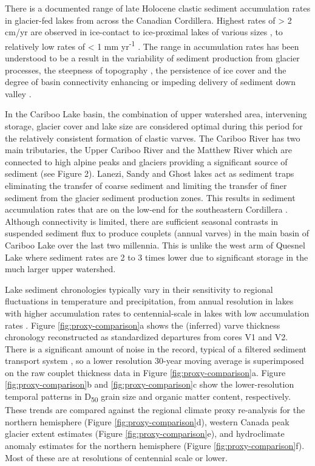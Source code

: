 \documentclass[Royal,times,doublespace,sageh]{sagej}
\begin{document}
There is a documented range of late Holocene clastic sediment
accumulation rates in glacier-fed lakes from across the Canadian
Cordillera. Highest rates of \textgreater{} 2 cm/yr are observed in
ice-contact to ice-proximal lakes of various sizes
\citep{Desloges1994, Crookshanks2008}, to relatively low rates of
\textless{} 1 mm yr\textsuperscript{-1} \citep{Gilbert2012}. The range
in accumulation rates has been understood to be a result in the
variability of sediment production from glacier processes, the steepness
of topography \citep{Ballantyne2002}, the persistence of ice cover and
the degree of basin connectivity enhancing or impeding delivery of
sediment down valley \citep{Wohl2019}.

In the Cariboo Lake basin, the combination of upper watershed area,
intervening storage, glacier cover and lake size are considered optimal
during this period for the relatively consistent formation of clastic
varves. The Cariboo River has two main tributaries, the Upper Cariboo
River and the Matthew River which are connected to high alpine peaks and
glaciers providing a significant source of sediment (see Figure 2).
Lanezi, Sandy and Ghost lakes act as sediment traps eliminating the
transfer of coarse sediment and limiting the transfer of finer sediment
from the glacier sediment production zones. This results in sediment
accumulation rates that are on the low-end for the southeastern
Cordillera \citep{Hodder2006b}. Although connectivity is limited, there
are sufficient seasonal contrasts in suspended sediment flux to produce
couplets (annual varves) in the main basin of Cariboo Lake over the last
two millennia. This is unlike the west arm of Quesnel Lake where
sediment rates are 2 to 3 times lower due to significant storage in the
much larger upper watershed.

Lake sediment chronologies typically vary in their sensitivity to
regional fluctuations in temperature and precipitation, from annual
resolution in lakes with higher accumulation rates
\citep[e.g.][]{Menounos2008c} to centennial-scale in lakes with low
accumulation rates \citep[e.g.][]{Desloges1999}. Figure
\ref{fig:proxy-comparison}a shows the (inferred) varve thickness
chronology reconstructed as standardized departures from cores V1 and
V2. There is a significant amount of noise in the record, typical of a
filtered sediment transport system \citep[e.g.][]{Jerolmack2010}, so a
lower resolution 30-year moving average is superimposed on the raw
couplet thickness data in Figure \ref{fig:proxy-comparison}a. Figure
\ref{fig:proxy-comparison}b and \ref{fig:proxy-comparison}c show the
lower-resolution temporal patterns in D\textsubscript{50} grain size and
organic matter content, respectively. These trends are compared against
the \citet{Moberg2005} regional climate proxy re-analysis for the
northern hemisphere (Figure \ref{fig:proxy-comparison}d),
\citet{Solomina2016} western Canada peak glacier extent estimates
(Figure \ref{fig:proxy-comparison}e), and \citet{Ljungqvist2016}
hydroclimate anomaly estimates for the northern hemisphere (Figure
\ref{fig:proxy-comparison}f). Most of these are at resolutions of
centennial scale or lower.
\end{document}
